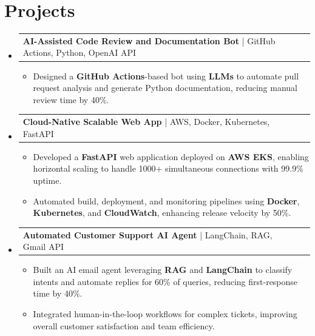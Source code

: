 \documentclass[letterpaper,11pt]{article}
\makeatletter
\newcommand{\resumeItem}[1]{
  \item\footnotesize{
    {#1 \vspace{-2pt}}
  }
}
\newcommand{\resumeProjectHeading}[2]{
    \item
    \begin{tabular*}{1.001\textwidth}{l@{\extracolsep{\fill}}r}
      \small#1 & \textbf{\small #2}\\
    \end{tabular*}\vspace{-7pt}
}
\newcommand{\resumeSubHeadingListStart}{\begin{itemize}[leftmargin=0pt, label={}]}
\newcommand{\resumeSubHeadingListEnd}{\end{itemize}}
\newcommand{\resumeItemListStart}{\begin{itemize}[leftmargin=*]}
\newcommand{\resumeItemListEnd}{\end{itemize}\vspace{-5pt}}
\makeatother
\begin{document}
\section{Projects}
    \vspace{-5pt}
    \resumeSubHeadingListStart
          \resumeProjectHeading
              {\textbf{AI-Assisted Code Review and Documentation Bot} | GitHub Actions, Python, OpenAI API}{}
        \resumeItemListStart
            \resumeItem{Designed a \textbf{GitHub Actions}-based bot using \textbf{LLMs} to automate pull request analysis and generate Python documentation, reducing manual review time by 40\%.}
        \resumeItemListEnd
        \vspace{-12pt}
    
    \resumeProjectHeading
        {\textbf{Cloud-Native Scalable Web App} | AWS, Docker, Kubernetes, FastAPI}{}
        \resumeItemListStart
            \resumeItem{Developed a \textbf{FastAPI} web application deployed on \textbf{AWS EKS}, enabling horizontal scaling to handle 1000+ simultaneous connections with 99.9\% uptime.}
            \resumeItem{Automated build, deployment, and monitoring pipelines using \textbf{Docker}, \textbf{Kubernetes}, and \textbf{CloudWatch}, enhancing release velocity by 50\%.}
        \resumeItemListEnd
          \vspace{-12pt}
      \resumeProjectHeading
          {\textbf{Automated Customer Support AI Agent} | LangChain, RAG, Gmail API}{}
          \resumeItemListStart
              \resumeItem{Built an AI email agent leveraging \textbf{RAG} and \textbf{LangChain} to classify intents and automate replies for 60\% of queries, reducing first-response time by 40\%.}
              \resumeItem{Integrated human-in-the-loop workflows for complex tickets, improving overall customer satisfaction and team efficiency.}
          \resumeItemListEnd 
    \resumeSubHeadingListEnd
\end{document}
